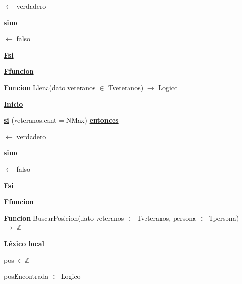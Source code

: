 \documentclass{article}
\begin{document}
                \hspace{16mm}$\leftarrow$ verdadero

            \hspace{12mm}\underline{\textbf{sino}}

                \hspace{16mm}$\leftarrow$ falso

        \hspace{12mm}\underline{\textbf{Fsi}}

    \hspace{4mm}\underline{\textbf{Ffuncion}}

    \vspace{4mm}

    \hspace{4mm}\underline{\textbf{Funcion}} Llena(dato veteranos $\in$ Tveteranos) $\rightarrow$ Logico

        \hspace{8mm}\underline{\textbf{Inicio}}

            \hspace{12mm}\underline{\textbf{si}} (veteranos.cant = NMax) \underline{\textbf{entonces}}

                \hspace{16mm}$\leftarrow$ verdadero

            \hspace{12mm}\underline{\textbf{sino}}

                \hspace{16mm}$\leftarrow$ falso

            \hspace{12mm}\underline{\textbf{Fsi}}

    \hspace{4mm}\underline{\textbf{Ffuncion}}

    \vspace{4mm}

    \hspace{4mm}\underline{\textbf{Funcion}} BuscarPosicion(dato veteranos $\in$ Tveteranos, persona $\in$ Tpersona) $\rightarrow$ $\mathbb{Z}$

        \hspace{8mm}\underline{\textbf{Léxico local}}

            \hspace{12mm}pos $\in \mathbb{Z}$
            
            \hspace{12mm}posEncontrada $\in$ Logico
            
\end{document}
